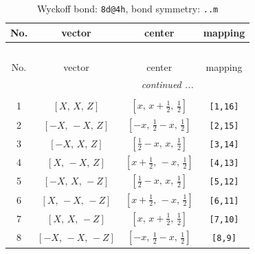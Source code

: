 \documentclass[fleqn,8pt]{jsarticle}
\begin{document}
\begin{longtable}{cccc}
\caption{Wyckoff bond: {\tt 8d@4h}, bond symmetry: {\tt ..m}}
 \\
 \hline \hline
No. & vector & center & mapping \\ \hline \endfirsthead

\multicolumn{3}{l}{\tablename\ \thetable{}} \\
 \hline \hline
No. & vector & center & mapping \\ \hline \endhead

 \hline \hline
\multicolumn{3}{r}{\footnotesize\it continued ...} \\ \endfoot

 \hline \hline
\multicolumn{3}{r}{} \\ \endlastfoot

1 & $\left[ X,\, X,\, Z \right]$ & $\left[ x,\, x + \frac{1}{2},\, \frac{1}{2} \right]$ & {\tt [1,16]} \\ \hline
2 & $\left[ - X,\, - X,\, Z \right]$ & $\left[ - x,\, \frac{1}{2} - x,\, \frac{1}{2} \right]$ & {\tt [2,15]} \\ \hline
3 & $\left[ - X,\, X,\, Z \right]$ & $\left[ \frac{1}{2} - x,\, x,\, \frac{1}{2} \right]$ & {\tt [3,14]} \\ \hline
4 & $\left[ X,\, - X,\, Z \right]$ & $\left[ x + \frac{1}{2},\, - x,\, \frac{1}{2} \right]$ & {\tt [4,13]} \\ \hline
5 & $\left[ - X,\, X,\, - Z \right]$ & $\left[ \frac{1}{2} - x,\, x,\, \frac{1}{2} \right]$ & {\tt [5,12]} \\ \hline
6 & $\left[ X,\, - X,\, - Z \right]$ & $\left[ x + \frac{1}{2},\, - x,\, \frac{1}{2} \right]$ & {\tt [6,11]} \\ \hline
7 & $\left[ X,\, X,\, - Z \right]$ & $\left[ x,\, x + \frac{1}{2},\, \frac{1}{2} \right]$ & {\tt [7,10]} \\ \hline
8 & $\left[ - X,\, - X,\, - Z \right]$ & $\left[ - x,\, \frac{1}{2} - x,\, \frac{1}{2} \right]$ & {\tt [8,9]} \\
\end{longtable}
\renewcommand{\arraystretch}{1.2}
\end{document}
